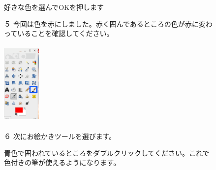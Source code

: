 \documentclass[a4paper,12pt]{jarticle}
\begin{document}
\begin{figure}[ht]
\begin{minipage}{\textwidth}
\begin{minipage}{8.984cm}
好きな色を選んでOKを押します


\bigskip
\begin{minipage}{5.984cm}
５
今回は色を赤にしました。赤く囲んであるところの色が赤に変わっていることを確認してください。


\end{minipage}
\end{minipage}
\end{minipage}

\includegraphics[width=1.866cm,height=4.15cm]{textbook-img127.png}
\begin{minipage}[b]{6.663cm}
６ 次にお絵かきツールを選びます。

青色で囲われているところをダブルクリックしてください。これで色付きの筆が使えるようになります。


\bigskip

\end{minipage}
\end{figure}
\clearpage
\end{document}
